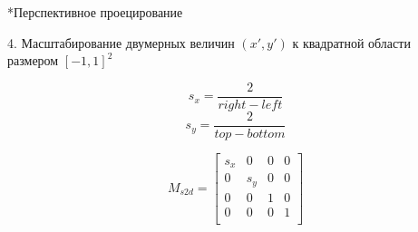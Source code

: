 \documentclass{beamer}
\begin{document}
	\begin{frame}{*Перспективное проецирование}

		4. Масштабирование двумерных величин $(x', y')$ к квадратной области размером $[-1, 1]^2$

		\[
			s_x = \frac{2}{right - left}
		\]
		\[
			s_y = \frac{2}{top - bottom}
		\]

		\[
			M_{s2d} = 
			\begin{bmatrix}
				s_x & 0 & 0 & 0 \\
				0 & s_y & 0 & 0 \\
				0 & 0 & 1 & 0 \\
				0 & 0 & 0 & 1 \\
			\end{bmatrix}	
		\]
	\end{frame}
\end{document}
